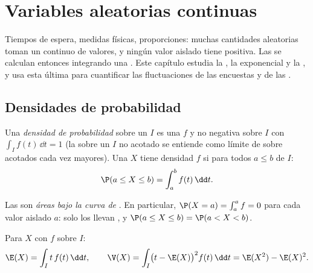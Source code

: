 \chapter{Variables aleatorias continuas}\label{ch:g12:contdist}

Tiempos de espera, medidas físicas, proporciones: muchas cantidades
aleatorias toman un continuo de valores, y ningún valor aislado tiene
 positiva. Las  se calculan entonces integrando
una \emph{}. Este capítulo estudia la , la
exponencial y la , y usa esta última para cuantificar
las fluctuaciones de las encuestas y de las .

\section{Densidades de probabilidad}

\begin{definition}\label{def:g12:contdist:density}
Una \emph{densidad de probabilidad} sobre un  $I$
es una  $f$  y no negativa sobre $I$ con
$\int_I f(t)\,\dd t = 1$ (la  sobre un $I$ no acotado se entiende
como límite de  sobre  acotados cada vez mayores). Una
 $X$ tiene densidad $f$ si para todos $a \leq b$ de $I$:
\[
\P(a \leq X \leq b) = \int_a^b f(t)\,\dd t .
\]
\end{definition}

Las  son \emph{áreas bajo la curva de }. En
particular, $\P(X = a) = \int_a^a f = 0$ para cada valor aislado $a$: solo
los  llevan , y
$\P(a \leq X \leq b) = \P(a < X < b)$.

\begin{definition}\label{def:g12:contdist:exp}
Para $X$ con  $f$ sobre $I$:
\[
\E(X) = \int_I t\,f(t)\,\dd t, \qquad
\V(X) = \int_I \bigl(t - \E(X)\bigr)^2 f(t)\,\dd t
= \E(X^2) - \E(X)^2 .
\]
\end{definition}

